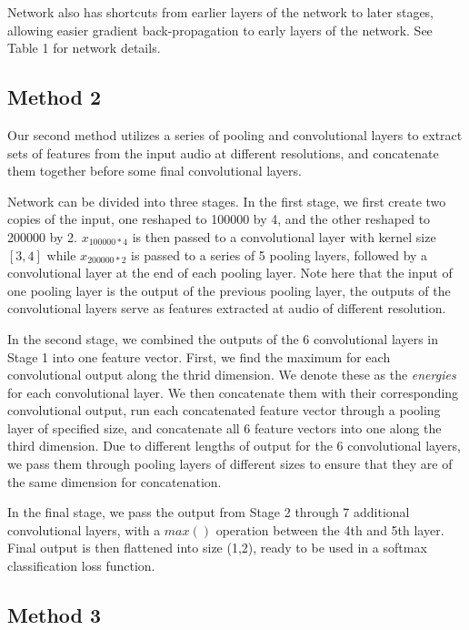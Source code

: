 \documentclass[10pt,twocolumn,letterpaper]{article}
\begin{document}
Network also has shortcuts from earlier layers of the network to later
stages, allowing easier gradient back-propagation to early layers of the
network. See Table 1 for network details.


\subsection{Method 2}

Our second method utilizes a series of pooling and convolutional layers to
extract sets of features from the input audio at different resolutions, and
concatenate them together before some final convolutional layers.

Network can be divided into three stages. In the first stage, we first
create two copies of the input, one reshaped to 100000 by 4, and the other
reshaped to 200000 by 2. \(x_{100000*4}\) is then passed to a convolutional
layer with kernel size \([3,4]\) while \(x_{200000*2}\) is passed to a
series of 5 pooling layers, followed by a convolutional layer at the end of
each pooling layer. Note here that the input of one pooling layer is the
output of the previous pooling layer, the outputs of the convolutional
layers serve as features extracted at audio of different resolution.

In the second stage, we combined the outputs of the 6 convolutional layers
in Stage 1 into one feature vector. First, we find the maximum for each
convolutional output along the thrid dimension. We denote these as the
\textit{energies} for each convolutional layer. We then concatenate them
with their corresponding convolutional output, run each concatenated
feature vector through a pooling layer of specified size, and concatenate
all 6 feature vectors into one along the third dimension. Due to different
lengths of output for the 6 convolutional layers, we pass them through
pooling layers of different sizes to ensure that they are of the same
dimension for concatenation.

In the final stage, we pass the output from Stage 2 through 7 additional
convolutional layers, with a \(max()\) operation between the 4th and 5th
layer. Final output is then flattened into size (1,2), ready to be used in
a softmax classification loss function.


\subsection{Method 3}
\end{document}
